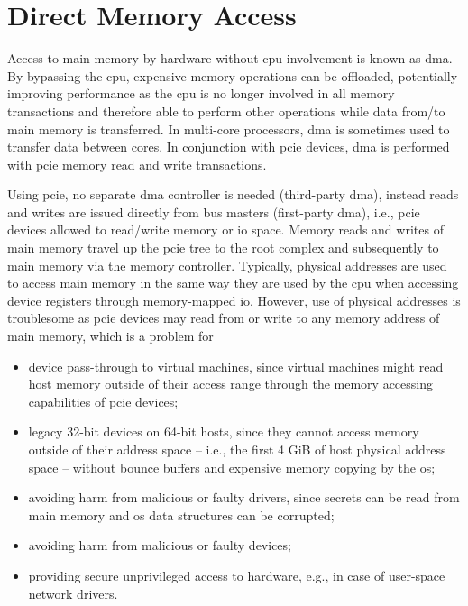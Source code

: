 \section{Direct Memory Access}
\label{sec:dma}

Access to main memory by hardware without \ac{cpu} involvement is known as
\acf{dma}. By bypassing the \ac{cpu}, expensive memory operations can be
offloaded, potentially improving performance as the \ac{cpu} is no longer
involved in all memory transactions and therefore able to perform other
operations while data from/to main memory is transferred. In multi-core
processors, \ac{dma} is sometimes used to transfer data between cores. In
conjunction with \ac{pcie} devices, \ac{dma} is performed with \ac{pcie} memory
read and write transactions.

Using \ac{pcie}, no separate \ac{dma} controller is needed (third-party
\ac{dma}), instead reads and writes are issued directly from bus masters
(first-party \ac{dma}), i.e., \ac{pcie} devices allowed to read/write memory or
\ac{io} space. Memory reads and writes of main memory travel up the \ac{pcie}
tree to the root complex and subsequently to main memory via the memory
controller. Typically, physical addresses are used to access main memory in the
same way they are used by the \ac{cpu} when accessing device registers through
memory-mapped \ac{io}. However, use of physical addresses is troublesome as
\ac{pcie} devices may read from or write to any memory address of main memory,
which is a problem for

\begin{itemize}
    \item device pass-through to virtual machines, since virtual machines might
        read host memory outside of their access range through the memory
        accessing capabilities of \ac{pcie} devices;
    \item legacy 32-bit devices on 64-bit hosts, since they cannot access memory
        outside of their address space -- i.e., the first 4 GiB of host physical
        address space -- without bounce buffers and expensive memory copying by
        the \ac{os};
    \item avoiding harm from malicious or faulty drivers, since secrets can be
        read from main memory and \ac{os} data structures can be corrupted;
    \item avoiding harm from malicious or faulty devices;
    \item providing secure unprivileged access to hardware, e.g., in case of
        user-space network drivers.
\end{itemize}

